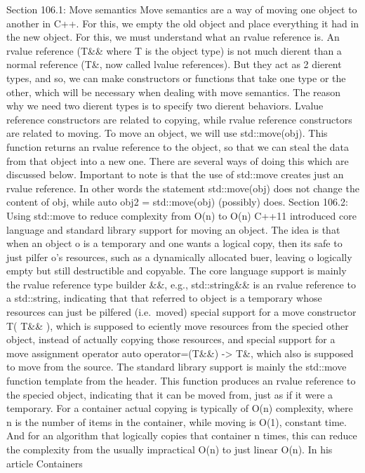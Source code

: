 Section 106.1: Move semantics Move semantics are a way of moving one
object to another in C++. For this, we empty the old object and place
everything it had in the new object. For this, we must understand what
an rvalue reference is. An rvalue reference (T\&\& where T is the object
type) is not much dierent than a normal reference (T\&, now called
lvalue references). But they act as 2 dierent types, and so, we can make
constructors or functions that take one type or the other, which will be
necessary when dealing with move semantics. The reason why we need two
dierent types is to specify two dierent behaviors. Lvalue reference
constructors are related to copying, while rvalue reference constructors
are related to moving. To move an object, we will use std::move(obj).
This function returns an rvalue reference to the object, so that we can
steal the data from that object into a new one. There are several ways
of doing this which are discussed below. Important to note is that the
use of std::move creates just an rvalue reference. In other words the
statement std::move(obj) does not change the content of obj, while auto
obj2 = std::move(obj) (possibly) does. Section 106.2: Using std::move to
reduce complexity from O(n) to O(n) C++11 introduced core language and
standard library support for moving an object. The idea is that when an
object o is a temporary and one wants a logical copy, then its safe to
just pilfer o's resources, such as a dynamically allocated buer, leaving
o logically empty but still destructible and copyable. The core language
support is mainly the rvalue reference type builder \&\&, e.g.,
std::string\&\& is an rvalue reference to a std::string, indicating that
that referred to object is a temporary whose resources can just be
pilfered (i.e.~moved) special support for a move constructor T( T\&\& ),
which is supposed to eciently move resources from the specied other
object, instead of actually copying those resources, and special support
for a move assignment operator auto operator=(T\&\&) -\textgreater{}
T\&, which also is supposed to move from the source. The standard
library support is mainly the std::move function template from the
header. This function produces an rvalue reference to the specied
object, indicating that it can be moved from, just as if it were a
temporary. For a container actual copying is typically of O(n)
complexity, where n is the number of items in the container, while
moving is O(1), constant time. And for an algorithm that logically
copies that container n times, this can reduce the complexity from the
usually impractical O(n) to just linear O(n). In his article Containers
